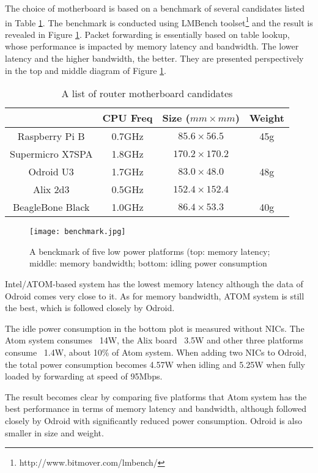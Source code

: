 The choice of motherboard is based on a benchmark of several candidates listed in Table \ref{candidates}. The benchmark is conducted using LMBench toolset\footnote{http://www.bitmover.com/lmbench/} and the result is revealed in Figure \ref{benchmark}. Packet forwarding is essentially based on table lookup, whose performance is impacted by memory latency and bandwidth. The lower latency and the higher bandwidth, the better. They are presented perspectively in the top and middle diagram of Figure \ref{benchmark}.

\begin{table}[htbp]
\centering
\begin{tabular}{c|ccc}
\hline
 & CPU Freq & Size ($mm\times mm$) & Weight \\
\hline
Raspberry Pi B & 0.7GHz & $85.6\times 56.5$ & 45g \\
Supermicro X7SPA & 1.8GHz & $170.2\times 170.2$ & \\
Odroid U3 & 1.7GHz & $83.0\times 48.0$ & 48g \\
Alix 2d3 & 0.5GHz & $152.4\times 152.4$ & \\
BeagleBone Black & 1.0GHz & $86.4\times 53.3$ & 40g \\
\hline
\end{tabular}
\caption{A list of router motherboard candidates}
\label{candidates}
\end{table}

\begin{figure}[htbp]
\centering
\texttt{[image: benchmark.jpg]}
\caption{A benckmark of five low power platforms (top: memory latency; middle: memory bandwidth; bottom: idling power consumption}
\label{benchmark}
\end{figure}

Intel/ATOM-based system has the lowest memory latency although the data of Odroid comes very close to it. As for memory bandwidth, ATOM system is still the best, which is followed closely by Odroid. 

The idle power consumption in the bottom plot is measured without NICs. The Atom system consumes ~14W, the Alix board ~3.5W and other three platforms consume ~1.4W, about 10\% of Atom system. When adding two NICs to Odroid, the total power consumption becomes 4.57W when idling and 5.25W when fully loaded by forwarding  at speed of 95Mbps.

The result becomes clear by comparing five platforms that Atom system has the best performance in terms of memory latency and bandwidth, although followed closely by Odroid with significantly reduced power consumption. Odroid is also smaller in size and weight.

